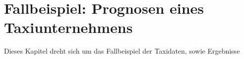\chapter{Fallbeispiel: Prognosen eines Taxiunternehmens}
\label{cha:Taxis} \label{cha:Experiment}
Dieses Kapitel dreht sich um das Fallbeispiel der Taxidaten, sowie Ergebnisse






